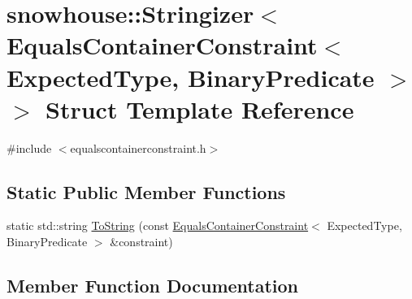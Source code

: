 \hypertarget{structsnowhouse_1_1Stringizer_3_01EqualsContainerConstraint_3_01ExpectedType_00_01BinaryPredicate_01_4_01_4}{}\section{snowhouse\+::Stringizer$<$ Equals\+Container\+Constraint$<$ Expected\+Type, Binary\+Predicate $>$ $>$ Struct Template Reference}
\label{structsnowhouse_1_1Stringizer_3_01EqualsContainerConstraint_3_01ExpectedType_00_01BinaryPredicate_01_4_01_4}


{\ttfamily \#include $<$equalscontainerconstraint.\+h$>$}

\subsection*{Static Public Member Functions}
\begin{DoxyCompactItemize}
\item 
static std\+::string \mbox{\hyperlink{structsnowhouse_1_1Stringizer_3_01EqualsContainerConstraint_3_01ExpectedType_00_01BinaryPredicate_01_4_01_4_ab0a00db0ad67458769b9e5eb815b348d}{To\+String}} (const \mbox{\hyperlink{structsnowhouse_1_1EqualsContainerConstraint}{Equals\+Container\+Constraint}}$<$ Expected\+Type, Binary\+Predicate $>$ \&constraint)
\end{DoxyCompactItemize}


\subsection{Member Function Documentation}
\mbox{\label{structsnowhouse_1_1Stringizer_3_01EqualsContainerConstraint_3_01ExpectedType_00_01BinaryPredicate_01_4_01_4_ab0a00db0ad67458769b9e5eb815b348d}} 
